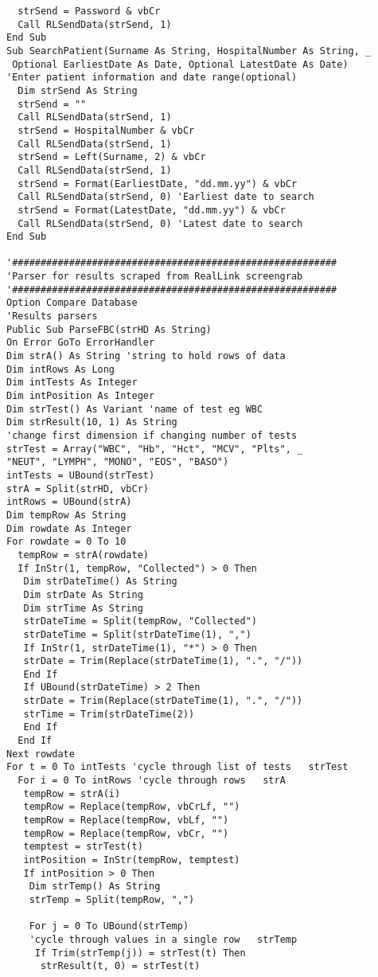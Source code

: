 \begin{lstlisting}
  strSend = Password & vbCr
  Call RLSendData(strSend, 1)
End Sub
Sub SearchPatient(Surname As String, HospitalNumber As String, _
 Optional EarliestDate As Date, Optional LatestDate As Date)
'Enter patient information and date range(optional)
  Dim strSend As String
  strSend = ""
  Call RLSendData(strSend, 1)
  strSend = HospitalNumber & vbCr
  Call RLSendData(strSend, 1)
  strSend = Left(Surname, 2) & vbCr
  Call RLSendData(strSend, 1)
  strSend = Format(EarliestDate, "dd.mm.yy") & vbCr
  Call RLSendData(strSend, 0) 'Earliest date to search
  strSend = Format(LatestDate, "dd.mm.yy") & vbCr
  Call RLSendData(strSend, 0) 'Latest date to search
End Sub

'#########################################################  
'Parser for results scraped from RealLink screengrab
'#########################################################
Option Compare Database
'Results parsers
Public Sub ParseFBC(strHD As String)
On Error GoTo ErrorHandler
Dim strA() As String 'string to hold rows of data
Dim intRows As Long
Dim intTests As Integer
Dim intPosition As Integer
Dim strTest() As Variant 'name of test eg WBC
Dim strResult(10, 1) As String 
'change first dimension if changing number of tests
strTest = Array("WBC", "Hb", "Hct", "MCV", "Plts", _
"NEUT", "LYMPH", "MONO", "EOS", "BASO")
intTests = UBound(strTest)
strA = Split(strHD, vbCr)
intRows = UBound(strA)
Dim tempRow As String
Dim rowdate As Integer
For rowdate = 0 To 10
  tempRow = strA(rowdate)
  If InStr(1, tempRow, "Collected") > 0 Then
   Dim strDateTime() As String
   Dim strDate As String
   Dim strTime As String
   strDateTime = Split(tempRow, "Collected")
   strDateTime = Split(strDateTime(1), ",")
   If InStr(1, strDateTime(1), "*") > 0 Then
   strDate = Trim(Replace(strDateTime(1), ".", "/"))
   End If
   If UBound(strDateTime) > 2 Then
   strDate = Trim(Replace(strDateTime(1), ".", "/"))
   strTime = Trim(strDateTime(2))
   End If
  End If
Next rowdate
For t = 0 To intTests 'cycle through list of tests   strTest
  For i = 0 To intRows 'cycle through rows   strA
   tempRow = strA(i)
   tempRow = Replace(tempRow, vbCrLf, "")
   tempRow = Replace(tempRow, vbLf, "")
   tempRow = Replace(tempRow, vbCr, "")
   temptest = strTest(t)
   intPosition = InStr(tempRow, temptest)
   If intPosition > 0 Then
    Dim strTemp() As String
    strTemp = Split(tempRow, ",")
    
    For j = 0 To UBound(strTemp) 
    'cycle through values in a single row   strTemp
     If Trim(strTemp(j)) = strTest(t) Then
      strResult(t, 0) = strTest(t)
      

\end{lstlisting}
